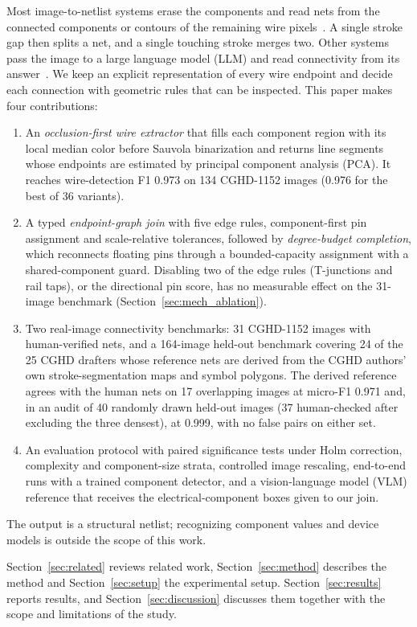 \documentclass{ieeeaccess}
\begin{document}
Most image-to-netlist systems erase the components and read nets from the connected components or contours of the remaining wire pixels~\cite{sina2026,peker2026}. A single stroke gap then splits a net, and a single touching stroke merges two. Other systems pass the image to a large language model (LLM) and read connectivity from its answer~\cite{masalachai2024}. We keep an explicit representation of every wire endpoint and decide each connection with geometric rules that can be inspected. This paper makes four contributions:
\begin{enumerate}
\item An \emph{occlusion-first wire extractor} that fills each component region with its local median color before Sauvola binarization and returns line segments whose endpoints are estimated by principal component analysis (PCA). It reaches wire-detection F1 0.973 on 134 CGHD-1152 images (0.976 for the best of 36 variants).
\item A typed \emph{endpoint-graph join} with five edge rules, component-first pin assignment and scale-relative tolerances, followed by \emph{degree-budget completion}, which reconnects floating pins through a bounded-capacity assignment with a shared-component guard. Disabling two of the edge rules (T-junctions and rail taps), or the directional pin score, has no measurable effect on the 31-image benchmark (Section~\ref{sec:mech_ablation}).
\item Two real-image connectivity benchmarks: 31 CGHD-1152 images with human-verified nets, and a 164-image held-out benchmark covering 24 of the 25 CGHD drafters whose reference nets are derived from the CGHD authors' own stroke-segmentation maps and symbol polygons. The derived reference agrees with the human nets on 17 overlapping images at micro-F1 0.971 and, in an audit of 40 randomly drawn held-out images (37 human-checked after excluding the three densest), at 0.999, with no false pairs on either set.
\item An evaluation protocol with paired significance tests under Holm correction, complexity and component-size strata, controlled image rescaling, end-to-end runs with a trained component detector, and a vision-language model (VLM) reference that receives the electrical-component boxes given to our join.
\end{enumerate}
The output is a structural netlist; recognizing component values and device models is outside the scope of this work.

Section~\ref{sec:related} reviews related work, Section~\ref{sec:method} describes the method and Section~\ref{sec:setup} the experimental setup. Section~\ref{sec:results} reports results, and Section~\ref{sec:discussion} discusses them together with the scope and limitations of the study.
\end{document}
